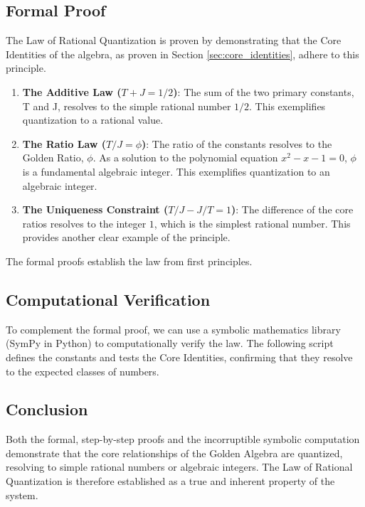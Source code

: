 \subsection{Formal Proof}
The Law of Rational Quantization is proven by demonstrating that the Core Identities of the algebra, as proven in Section \ref{sec:core_identities}, adhere to this principle.

\begin{enumerate}
    \item \textbf{The Additive Law (\(T+J=1/2\))}: The sum of the two primary constants, T and J, resolves to the simple rational number $1/2$. This exemplifies quantization to a rational value.

    \item \textbf{The Ratio Law (\(T/J=\phi\))}: The ratio of the constants resolves to the Golden Ratio, $\phi$. As a solution to the polynomial equation $x^2 - x - 1 = 0$, $\phi$ is a fundamental algebraic integer. This exemplifies quantization to an algebraic integer.

    \item \textbf{The Uniqueness Constraint (\(T/J - J/T = 1\))}: The difference of the core ratios resolves to the integer $1$, which is the simplest rational number. This provides another clear example of the principle.
\end{enumerate}
The formal proofs establish the law from first principles.

\subsection{Computational Verification}
To complement the formal proof, we can use a symbolic mathematics library (SymPy in Python) to computationally verify the law. The following script defines the constants and tests the Core Identities, confirming that they resolve to the expected classes of numbers.

\subsection{Conclusion}
Both the formal, step-by-step proofs and the incorruptible symbolic computation demonstrate that the core relationships of the Golden Algebra are quantized, resolving to simple rational numbers or algebraic integers. The Law of Rational Quantization is therefore established as a true and inherent property of the system.

\newpage
